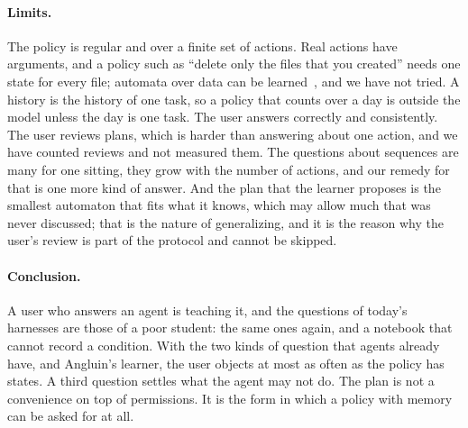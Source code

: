 \documentclass[acmsmall,nonacm,screen]{acmart}
\begin{document}
\paragraph{Limits.} The policy is regular and over a finite set of actions. Real actions
have arguments, and a policy such as ``delete only the files that you created'' needs one
state for every file; automata over data can be learned~\cite{cassel2016}, and we have not
tried. A history is the history of one task, so a policy that counts over a day is outside
the model unless the day is one task. The user answers correctly and consistently. The user
reviews plans, which is harder than answering about one action, and we have counted reviews
and not measured them. The questions about sequences are many for one sitting, they grow
with the number of actions, and our remedy for that is one more kind of answer. And the plan
that the learner proposes is the smallest automaton that fits what it knows, which may allow
much that was never discussed; that is the nature of generalizing, and it is the reason why
the user's review is part of the protocol and cannot be skipped.

\paragraph{Conclusion.} A user who answers an agent is teaching it, and the questions of
today's harnesses are those of a poor student: the same ones again, and a notebook that
cannot record a condition. With the two kinds of question that agents already have, and
Angluin's learner, the user objects at most as often as the policy has states. A third
question settles what the agent may not do. The plan is not a convenience on top of
permissions. It is the form in which a policy with memory can be asked for at all.



\end{document}
